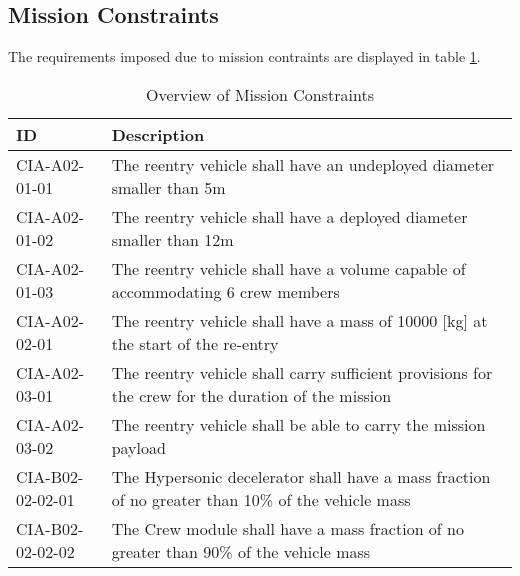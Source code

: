 \subsection{Mission Constraints} \label{sec:MisCon}
The requirements  imposed due to mission contraints are displayed in table \ref{tab:MissionCon}.
\begin{table}[H]
	\caption{Overview of Mission Constraints}
	\begin{tabular}{|p{}|p{}|}
    \hline
    ID          & Description                                                                                                      \\ \hline \hline
		CIA-A02-01-01 & The reentry vehicle shall have an undeployed diameter smaller than 5m                         				            \\ \hline
		CIA-A02-01-02 & The reentry vehicle shall have a deployed diameter smaller than 12m                         				            \\ \hline
		CIA-A02-01-03 & The reentry vehicle shall have a volume capable of accommodating 6 crew members                        				            \\ \hline
		CIA-A02-02-01 & The reentry vehicle shall have a mass of 10000 [kg] at the start of the re-entry                       				            \\ \hline
		CIA-A02-03-01 & The reentry vehicle shall carry sufficient provisions for the crew for the duration of the mission \\ \hline
		CIA-A02-03-02 & The reentry vehicle shall be able to carry the mission payload								\\ \hline
		CIA-B02-02-02-01 & The Hypersonic decelerator shall have a mass fraction of no greater than 10\% of the vehicle mass  \\ \hline
		CIA-B02-02-02-02 & The Crew module shall have a mass fraction of no greater than 90\% of the vehicle mass \\ \hline
	
		\end{tabular}
    \label{tab:MissionCon}
\end{table}